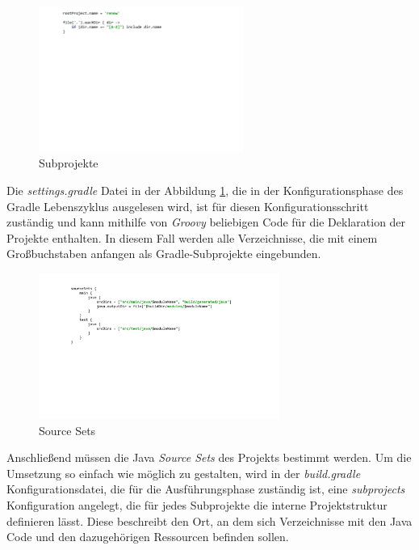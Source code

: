 	\begin{figure}[h!]
	  \centering
	  \includegraphics[width=0.6\textwidth]{material/images/settingsgradle.pdf}
	  \caption{Subprojekte}
	  \label{fig:subprojekte}
	\end{figure}

 	Die \textit{settings.gradle} Datei in der Abbildung \ref{fig:subprojekte}, die in der Konfigurationsphase des Gradle Lebenszyklus ausgelesen wird, ist für diesen Konfigurationsschritt zuständig und kann mithilfe von \textit{Groovy} beliebigen Code für die Deklaration der Projekte enthalten. In diesem Fall werden alle Verzeichnisse, die mit einem Großbuchstaben anfangen als Gradle-Subprojekte eingebunden.\bigbreak

	\begin{figure}[h!]
	  \centering
	  \includegraphics[width=0.7\textwidth]{material/images/sourcesets.pdf}
	  \caption{Source Sets}
	  \label{fig:Source_Sets}
	\end{figure}

 	Anschließend müssen die Java \textit{Source Sets} des Projekts bestimmt werden. Um die Umsetzung so einfach wie möglich zu gestalten, wird in der \textit{build.gradle} Konfigurationsdatei, die für die Ausführungsphase zuständig ist, eine \textit{subprojects} Konfiguration angelegt, die für jedes Subprojekte die interne Projektstruktur definieren lässt. Diese beschreibt den Ort, an dem sich  Verzeichnisse mit den Java Code und den dazugehörigen Ressourcen befinden sollen.\bigbreak

